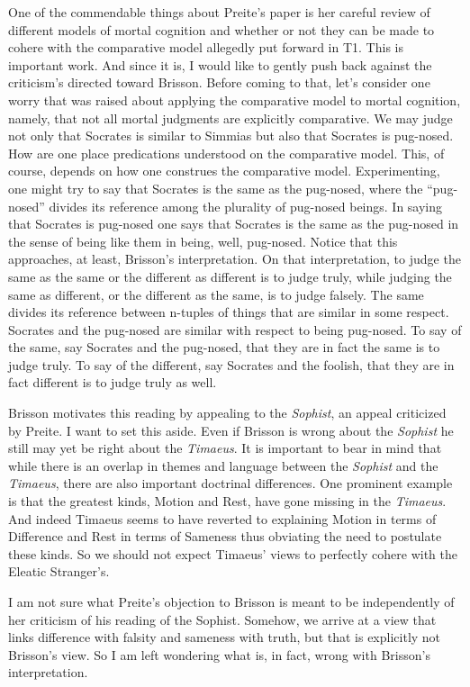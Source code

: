 \documentclass[12pt]{article}
\begin{document}
One of the commendable things about Preite's paper is her careful review of different models of mortal cognition and whether or not they can be made to cohere with the comparative model allegedly put forward in T1. This is important work. And since it is, I would like to gently push back against the criticism's directed toward Brisson. Before coming to that, let's consider one worry that was raised about applying the comparative model to mortal cognition, namely, that not all mortal judgments are explicitly comparative. We may judge not only that Socrates is similar to Simmias but also that Socrates is pug-nosed. How are one place predications understood on the comparative model. This, of course, depends on how one construes the comparative model. Experimenting, one might try to say that Socrates is the same as the pug-nosed, where the ``pug-nosed'' divides its reference among the plurality of pug-nosed beings. In saying that Socrates is pug-nosed one says that Socrates is the same as the pug-nosed in the sense of being like them in being, well, pug-nosed. Notice that this approaches, at least, Brisson's interpretation. On that interpretation, to judge the same as the same or the different as different is to judge truly, while judging the same as different, or the different as the same, is to judge falsely. The same divides its reference between n-tuples of things that are similar in some respect. Socrates and the pug-nosed are similar with respect to being pug-nosed. To say of the same, say Socrates and the pug-nosed, that they are in fact the same is to judge truly. To say of the different, say Socrates and the foolish, that they are in fact different is to judge truly as well. 

Brisson motivates this reading by appealing to the \emph{Sophist}, an appeal criticized by Preite. I want to set this aside. Even if Brisson is wrong about the \emph{Sophist} he still may yet be right about the \emph{Timaeus}. It is important to bear in mind that while there is an overlap in themes and language between the \emph{Sophist} and the \emph{Timaeus}, there are also important doctrinal differences. One prominent example is that the greatest kinds, Motion and Rest, have gone missing in the \emph{Timaeus}. And indeed Timaeus seems to have reverted to explaining Motion in terms of Difference and Rest in terms of Sameness thus obviating the need to postulate these kinds. So we should not expect Timaeus' views to perfectly cohere with the Eleatic Stranger's. 

I am not sure what Preite's objection to Brisson is meant to be independently of her criticism of his reading of the Sophist. Somehow, we arrive at a view that links difference with falsity and sameness with truth, but that is explicitly not Brisson's view. So I am left wondering what is, in fact, wrong with Brisson's interpretation.





% 
% 
\end{document}
